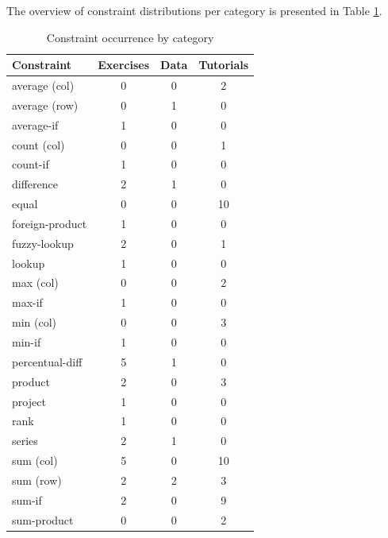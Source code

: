 The overview of constraint distributions per category is presented in Table \ref{tab:constraint_by_category}.

\begin{table}
  \centering
  \caption{Constraint occurrence by category}
  \label{tab:constraint_by_category}
  \begin{tabular}{l | c c c }
    \textbf{Constraint} & \textbf{Exercises} & \textbf{Data} & \textbf{Tutorials}  \\\hline
    average (col) & 0 & 0 & 2 \\
    average (row) & 0 & 1 & 0 \\
    average-if    & 1 & 0 & 0 \\
    count (col) & 0 & 0 & 1 \\
    count-if & 1 & 0 & 0 \\
    difference & 2 & 1 & 0 \\
    equal & 0 & 0 & 10 \\
    foreign-product & 1 & 0 & 0 \\
    fuzzy-lookup & 2 & 0 & 1 \\
    lookup & 1 & 0 & 0 \\
    max (col) & 0 & 0 & 2 \\
    max-if & 1 & 0 & 0 \\
    min (col) & 0 & 0 & 3 \\
    min-if & 1 & 0 & 0 \\
    percentual-diff & 5 & 1 & 0 \\
    product & 2 & 0 & 3 \\
    project & 1 & 0 & 0 \\
    rank & 1 & 0 & 0 \\
    series & 2 & 1 & 0 \\
    sum (col) & 5 & 0 & 10 \\
    sum (row) & 2 & 2 & 3 \\
    sum-if & 2 & 0 & 9 \\
    sum-product & 0 & 0 & 2 \\
  \end{tabular}
\end{table}


